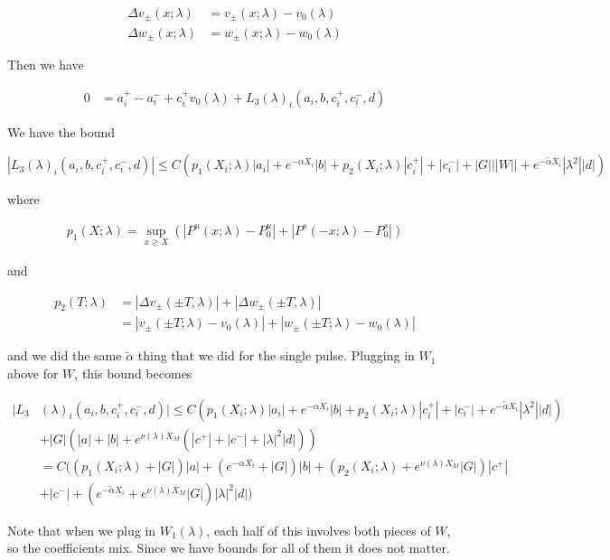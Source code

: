 \documentclass[12pt]{article}
\begin{document}
\begin{enumerate}
\begin{align*}
\Delta v_\pm(x; \lambda) &= v_\pm(x; \lambda) - v_0(\lambda) \\
\Delta w_\pm(x; \lambda) &= w_\pm(x; \lambda) - w_0(\lambda)
\end{align*}

Then we have 

\begin{align*}
0 &= a_i^+ - a_i^- + c_i^+ v_0(\lambda) + L_3(\lambda)_i(a_i, b, c_i^+, c_i^-, d)
\end{align*}

We have the bound 

\[
|L_3(\lambda)_i(a_i, b, c_i^+, c_i^-, d)| \leq C ( p_1(X_i; \lambda)|a_i|
+ e^{-\alpha X_i}|b| + p_2(X_i; \lambda)|c_i^+| + |c_i^-| + |G| ||W|| + e^{-\tilde{\alpha} X_i} |\lambda^2| |d| )
\]

where

\begin{align*}
p_1(X;\lambda) = \sup_{x \geq X} (|P^u(x;\lambda) - P_0^u| + |P^s(-x;\lambda) - P_0^s|)
\end{align*}

and

\begin{align*}
p_2(T; \lambda) &= |\Delta v_\pm(\pm T, \lambda)| + |\Delta w_\pm(\pm T, \lambda)|\\
&= |v_\pm(\pm T; \lambda) - v_0(\lambda)| + |w_\pm(\pm T; \lambda) - w_0(\lambda)|
\end{align*}

and we did the same $\tilde{\alpha}$ thing that we did for the single pulse. Plugging in $W_1$ above for $W$, this bound becomes

\begin{align*}
|L_3&(\lambda)_i(a_i, b, c_i^+, c_i^-, d)| \leq C ( p_1(X_i; \lambda)|a_i|
+ e^{-\alpha X_i}|b| + p_2(X_i; \lambda)|c_i^+| + |c_i^-| + e^{-\tilde{\alpha} X_i} |\lambda^2| |d| ) \\
&+ |G| (|a| + |b| + e^{\nu(\lambda)X_M}(|c^+| + |c^-| + |\lambda|^2 |d| )) \\
&= C( (p_1(X_i; \lambda) + |G|)|a| + (e^{-\alpha X_i} + |G|) |b| + ( p_2(X_i; \lambda) + e^{\nu(\lambda)X_M} |G|) |c^+| \\
&+ |c^-| + (e^{-\tilde{\alpha} X_i} + e^{\nu(\lambda)X_M} |G|) |\lambda|^2 |d| )
\end{align*}

Note that when we plug in $W_1(\lambda)$, each half of this involves both pieces of $W$, so the coefficients mix. Since we have bounds for all of them it does not matter.\\ 


\end{enumerate}
\end{document}
